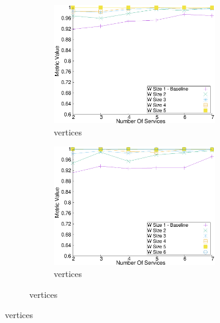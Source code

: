 \begin{figure}[H]
\begin{adjustbox}{minipage=\linewidth,scale=0.75}
\begin{subfigure}{0.45\textwidth}
\begin{subfigure}{\textwidth}
        \label{fig:quality_window_wide_qualitative_n4}
      \end{subfigure}
      \begin{subfigure}{\textwidth}
        \includegraphics[width=\textwidth]{Images/graphs/window_quality_performance_diff_qual_n7_s7_20_100_n5}
        \caption{ vertices}
        \label{fig:quality_window_wide_qualitative_n5}
      \end{subfigure}

      \begin{subfigure}{\textwidth}
        \includegraphics[width=\textwidth]{Images/graphs/window_quality_performance_diff_qual_n7_s7_20_100_n6}
        \caption{ vertices}
        \label{fig:quality_window_wide_qualitative_n6}
      \end{subfigure}


\end{subfigure}
\end{adjustbox}
\end{figure}
